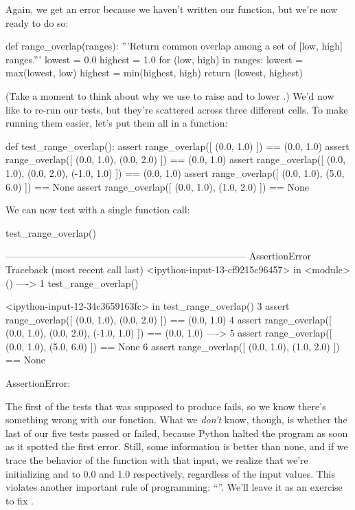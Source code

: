Again, we get an error because we haven't written our function, but
we're now ready to do so:

\begin{VerbIn}
def range_overlap(ranges):
    '''Return common overlap among a set of [low, high] ranges.'''
    lowest = 0.0
    highest = 1.0
    for (low, high) in ranges:
        lowest = max(lowest, low)
        highest = min(highest, high)
    return (lowest, highest)
\end{VerbIn}

(Take a moment to think about why we use  to raise
 and  to lower .) We'd now
like to re-run our tests, but they're scattered across three different
cells. To make running them easier, let's put them all in a function:

\begin{VerbIn}
def test_range_overlap():
    assert range_overlap([ (0.0, 1.0) ]) == (0.0, 1.0)
    assert range_overlap([ (0.0, 1.0), (0.0, 2.0) ]) == (0.0, 1.0)
    assert range_overlap([ (0.0, 1.0), (0.0, 2.0), (-1.0, 1.0) ]) == (0.0, 1.0)
    assert range_overlap([ (0.0, 1.0), (5.0, 6.0) ]) == None
    assert range_overlap([ (0.0, 1.0), (1.0, 2.0) ]) == None
\end{VerbIn}

We can now test  with a single function call:

\begin{VerbIn}
test_range_overlap()
\end{VerbIn}

\begin{VerbErr}
---------------------------------------------------------------------------
AssertionError                            Traceback (most recent call last)
<ipython-input-13-cf9215c96457> in <module>()
----> 1 test_range_overlap()

<ipython-input-12-34c3659163fc> in test_range_overlap()
      3     assert range_overlap([ (0.0, 1.0), (0.0, 2.0) ]) == (0.0, 1.0)
      4     assert range_overlap([ (0.0, 1.0), (0.0, 2.0), (-1.0, 1.0) ]) == (0.0, 1.0)
----> 5     assert range_overlap([ (0.0, 1.0), (5.0, 6.0) ]) == None
      6     assert range_overlap([ (0.0, 1.0), (1.0, 2.0) ]) == None

AssertionError: 
\end{VerbErr}

The first of the tests that was supposed to produce  fails,
so we know there's something wrong with our function. What we
\emph{don't} know, though, is whether the last of our five tests passed
or failed, because Python halted the program as soon as it spotted the
first error. Still, some information is better than none, and if we
trace the behavior of the function with that input, we realize that
we're initializing  and  to 0.0 and 1.0
respectively, regardless of the input values. This violates another
important rule of programming:
``''. We'll leave it as an exercise to fix
.

